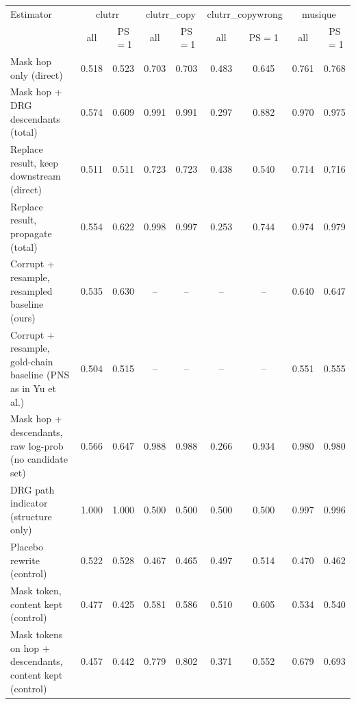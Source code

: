 \begin{tabular}{lcccccccc}
\toprule
Estimator & \multicolumn{2}{c}{clutrr} & \multicolumn{2}{c}{clutrr\_copy} & \multicolumn{2}{c}{clutrr\_copywrong} & \multicolumn{2}{c}{musique} \\
 & all & PS$=$1 & all & PS$=$1 & all & PS$=$1 & all & PS$=$1 \\
\midrule
Mask hop only (direct) & 0.518 & 0.523 & 0.703 & 0.703 & 0.483 & 0.645 & 0.761 & 0.768 \\
Mask hop + DRG descendants (total) & 0.574 & 0.609 & 0.991 & 0.991 & 0.297 & 0.882 & 0.970 & 0.975 \\
Replace result, keep downstream (direct) & 0.511 & 0.511 & 0.723 & 0.723 & 0.438 & 0.540 & 0.714 & 0.716 \\
Replace result, propagate (total) & 0.554 & 0.622 & 0.998 & 0.997 & 0.253 & 0.744 & 0.974 & 0.979 \\
Corrupt + resample, resampled baseline (ours) & 0.535 & 0.630 & -- & -- & -- & -- & 0.640 & 0.647 \\
Corrupt + resample, gold-chain baseline (PNS as in Yu et al.) & 0.504 & 0.515 & -- & -- & -- & -- & 0.551 & 0.555 \\
Mask hop + descendants, raw log-prob (no candidate set) & 0.566 & 0.647 & 0.988 & 0.988 & 0.266 & 0.934 & 0.980 & 0.980 \\
DRG path indicator (structure only) & 1.000 & 1.000 & 0.500 & 0.500 & 0.500 & 0.500 & 0.997 & 0.996 \\
Placebo rewrite (control) & 0.522 & 0.528 & 0.467 & 0.465 & 0.497 & 0.514 & 0.470 & 0.462 \\
Mask token, content kept (control) & 0.477 & 0.425 & 0.581 & 0.586 & 0.510 & 0.605 & 0.534 & 0.540 \\
Mask tokens on hop + descendants, content kept (control) & 0.457 & 0.442 & 0.779 & 0.802 & 0.371 & 0.552 & 0.679 & 0.693 \\
\bottomrule
\end{tabular}
